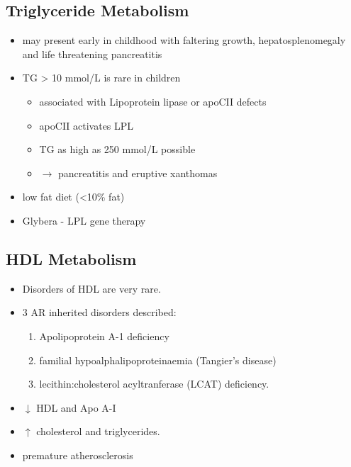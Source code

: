 \documentclass{scrartcl}
\begin{document}
\subsection{Triglyceride Metabolism}
\label{sec:org048c848}
\begin{itemize}
\item may present early in childhood with faltering growth,
hepatosplenomegaly and life threatening pancreatitis
\item TG \textgreater{} 10 mmol/L is rare in children
\begin{itemize}
\item associated with Lipoprotein lipase or apoCII defects
\item apoCII activates LPL
\item TG as high as 250 mmol/L possible
\item \(\to\) pancreatitis and eruptive xanthomas
\end{itemize}
\item low fat diet (<10\% fat)
\item Glybera - LPL gene therapy
\end{itemize}
\subsection{HDL Metabolism}
\label{sec:org0986494}
\begin{itemize}
\item Disorders of HDL are very rare.
\item 3 AR inherited disorders described:
\begin{enumerate}
\item Apolipoprotein A-1 deficiency
\item familial hypoalphalipoproteinaemia (Tangier’s disease)
\item lecithin:cholesterol acyltranferase (LCAT) deficiency.
\end{enumerate}
\item \(\downarrow\) HDL and Apo A-I
\item \(\uparrow\) cholesterol and triglycerides.
\item premature atherosclerosis
\end{itemize}
\end{document}
